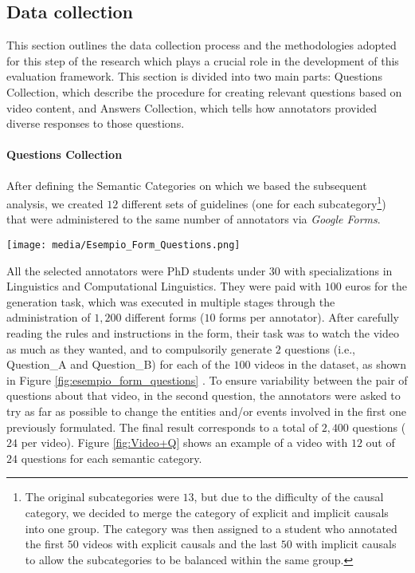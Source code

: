 \subsection{Data collection}
\label{subsec:Datacoll}
This section outlines the data collection process and the methodologies adopted for this step of the research which plays a crucial role in the development of this evaluation framework.
This section is divided into two main parts: Questions Collection, which describe the procedure for creating relevant questions based on video content, and Answers Collection, which tells how annotators provided diverse responses to those questions.
\paragraph{Questions Collection}
After defining the Semantic Categories on which we based the subsequent analysis, we created $12$ different sets of guidelines (one for each subcategory\footnote{The original subcategories were $13$, but due to the difficulty of the causal category, we decided to merge the category of explicit and implicit causals into one group. The category was then assigned to a student who annotated the first $50$ videos with explicit causals and the last $50$ with implicit causals to allow the subcategories to be balanced within the same group.}) that were administered to the same number of annotators via \textit{Google Forms}.
\begin{figure*}[h]
    \centering
  \texttt{[image: media/Esempio\_Form\_Questions.png]}
  \caption{Example of a \textit{Google Form} used for collecting 2 Questions for each video for each of the assigned category}
  \label{fig:esempio_form_questions}
\end{figure*}
\noindent All the selected annotators were PhD students under $30$ with specializations in Linguistics and Computational Linguistics. They were paid with $100$ euros for the generation task, which was executed in multiple stages through the administration of $1,200$ different forms ($10$ forms per annotator). After carefully reading the rules and instructions in the form, their task was to watch the video as much as they wanted, and to compulsorily generate $2$ questions (i.e., Question\_A and Question\_B) for each of the $100$ videos in the dataset, as shown in Figure \ref{fig:esempio_form_questions} . To ensure variability between the pair of questions about that video, in the second question, the annotators were asked to try as far as possible to change the entities and/or events involved in the first one previously formulated. The final result corresponds to a total of $2,400$ questions ($24$ per video). Figure \ref{fig:Video+Q} shows an example of a video with $12$ out of $24$ questions for each semantic category.\\

